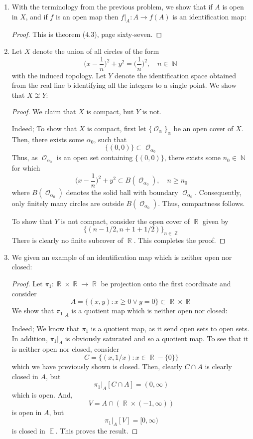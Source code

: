 \documentclass{book}
\DeclareMathOperator*{\R}{\mathbb{R}}
\DeclareMathOperator*{\N}{\mathbb{N}}
\DeclareMathOperator*{\E}{\mathbb{E}}
\DeclareMathOperator*{\Ocal}{\mathcal{O}}
\DeclareMathOperator*{\Z}{\mathbb{Z}}
\begin{document}
\begin{enumerate}[(1)]
    \item With the terminology from the previous problem, we show that if $A$ is open in $X$, and if $f$ is an open map then $f|_A : A \rightarrow f(A)$ is an identification map: 
        \begin{proof} This is theorem ($4.3$), page sixty-seven. 
        \end{proof}

    \item Let $X$ denote the union of all circles of the form 
        \[\Big(x - \frac{1}{n}\Big)^2 + y^2 = \Big(\frac{1}{n}\Big)^2, \quad n \in \N\]
        with the induced topology. Let $Y$ denote the identification space obtained from the real line b identifying all the integers to a single point. We show that $X \not\cong Y$: 
        \begin{proof} We claim that $X$ is compact, but $Y$ is not. 
            \par Indeed; To show that $X$ is compact, first let $\{ \Ocal_\alpha \}_\alpha$ be an open cover of $X$. Then, there exists some $\alpha_0$, such that 
            \[\{(0,0)\} \subset \Ocal_{\alpha_0} \]
            Thus, as $\Ocal_{\alpha_0}$ is an open set containing $\{(0,0)\}$, there exists some $n_0 \in \N$ for which 
            \[\Big(x - \frac{1}{n}\Big)^2 + y^2 \subset B(\Ocal_{\alpha_0}), \quad n \geq n_0 \]
            where $B(\Ocal_{\alpha_0})$ denotes the solid ball with boundary $\Ocal_{\alpha_0}$. Consequently, only finitely many circles are outside $B(\Ocal_{\alpha_0})$. Thus, compactness follows.
            \par To show that $Y$ is not compact, consider the open cover of $\R$ given by 
            \[\{(n -1/2, n+1+1/2) \}_{n \in \Z} \]
            There is clearly no finite subcover of $\R$. This completes the proof. 
        \end{proof}

    \item We given an example of an identification map which is neither open nor closed: 
        \begin{proof} Let $\pi_1: \R \times \R \rightarrow \R$ be projection onto the first coordinate and consider
            \[A = \{(x,y) : x \geq 0 \lor y = 0 \} \subset \R \times \R\]
            We show that $\pi_1|_A$ is a quotient map which is neither open nor closed: 
            \par Indeed; We know that $\pi_1$ is a quotient map, as it send open sets to open sets. In addition, $\pi_1|_A$ is obviously saturated and so a quotient map. To see that it is neither open nor closed, consider 
            \[C = \{ (x, 1/x) : x \in \R - \{0\} \}\]
            which we have previously shown is closed. Then, clearly $C \cap A$ is clearly closed in $A$, but 
            \[\pi_1 |_A [C \cap A] = (0,\infty)\]
            which is open. And, 
            \[V = A \cap (\R \times (-1, \infty))\]
            is open in $A$, but 
            \[\pi_1|_A [V] = [0, \infty) \]
            is closed in $\E$. This proves the result. 
        \end{proof}


\end{enumerate}
\end{document}
